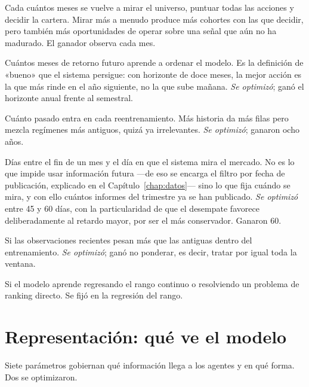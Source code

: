 \begin{description}[leftmargin=0cm,style=nextline,itemsep=0.5em]
  \item[Cadencia de observación] Cada cuántos meses se vuelve a mirar el universo, puntuar todas las
  acciones y decidir la cartera. Mirar más a menudo produce más cohortes con las que decidir, pero
  también más oportunidades de operar sobre una señal que aún no ha madurado. El ganador observa
  cada mes.
  \item[Horizonte de la etiqueta] Cuántos meses de retorno futuro aprende a ordenar el modelo. Es la
  definición de «bueno» que el sistema persigue: con horizonte de doce meses, la mejor acción es la
  que más rinde en el año siguiente, no la que sube mañana. \emph{Se optimizó}; ganó el horizonte
  anual frente al semestral.
  \item[Años de historia por ajuste] Cuánto pasado entra en cada reentrenamiento. Más historia da
  más filas pero mezcla regímenes más antiguos, quizá ya irrelevantes. \emph{Se optimizó}; ganaron
  ocho años.
  \item[Retardo de observación] Días entre el fin de un mes y el día en que el sistema mira el
  mercado. No es lo que impide usar información futura ---de eso se encarga el filtro por fecha de
  publicación, explicado en el Capítulo~\ref{chap:datos}--- sino lo que fija cuándo se mira, y con
  ello cuántos informes del trimestre ya se han publicado. \emph{Se optimizó} entre 45 y 60 días,
  con la particularidad de que el desempate favorece deliberadamente al retardo mayor, por ser el
  más conservador. Ganaron 60.
  \item[Ponderación por recencia] Si las observaciones recientes pesan más que las antiguas dentro
  del entrenamiento. \emph{Se optimizó}; ganó no ponderar, es decir, tratar por igual toda la
  ventana.
  \item[Objetivo de aprendizaje] Si el modelo aprende regresando el rango continuo o resolviendo un
  problema de ranking directo. Se fijó en la regresión del rango.
\end{description}

\section{Representación: qué ve el modelo}

Siete parámetros gobiernan qué información llega a los agentes y en qué forma. Dos se optimizaron.

